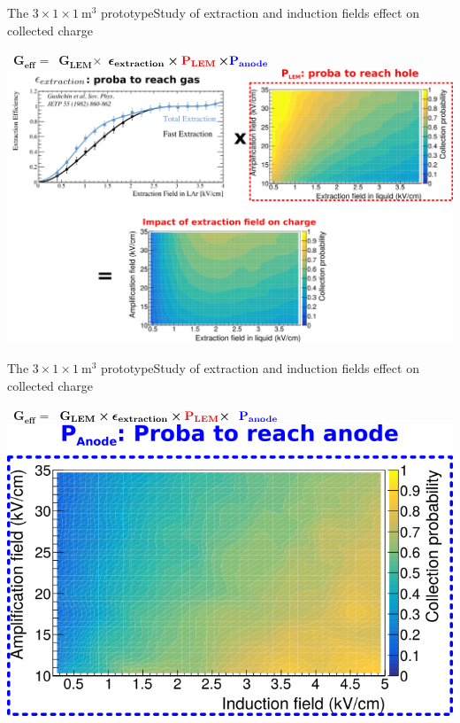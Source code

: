 \documentclass[10pt]{beamer}
\begin{document}
    \begin{frame}{The \texorpdfstring{$3 \times 1 \times \SI{1}{\meter\cubed}$}{311} prototype}{Study of extraction and induction fields effect on collected charge}
    	\begin{scriptsize}
    			\hbox{
	    			\hbox{$\mathbf{G_{eff}=}$}
	    			\hbox{$\mathbf{G_{LEM}\boldsymbol{\times}}$}
	    			$\mathbf{\boldsymbol{\epsilon}_{extraction} \boldsymbol{\times} \textcolor{red}{P_{LEM}}}$\hbox{$\mathbf{\boldsymbol{\times} \textcolor{blue}{P_{anode}} }$}
	    		}
    		\centering \includegraphics[width=.95\textwidth]{figures/311/effs_extr.png}\\
    	\end{scriptsize} 
    \end{frame}
    
     \begin{frame}{The \texorpdfstring{$3 \times 1 \times \SI{1}{\meter\cubed}$}{311} prototype}{Study of extraction and induction fields effect on collected charge}
     	\begin{scriptsize}
     			\hbox{\centering
	     			\hbox{$\mathbf{G_{eff}=}$}
	     			\hbox{$\mathbf{G_{LEM}\boldsymbol{\times}\boldsymbol{\epsilon}_{extraction} \boldsymbol{\times} \textcolor{red}{P_{LEM}}\boldsymbol{\times}}$}
	     			$\mathbf{\textcolor{blue}{P_{anode}} }$
     			}\vspace{1cm}
     		\centering \includegraphics[width=.7\textwidth]{figures/311/effs_ind.png}\\
     	\end{scriptsize} 
     \end{frame}
    
\end{document}
